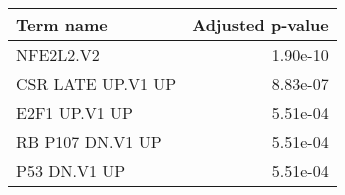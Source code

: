 \begin{tabular}{lr}
\toprule
         Term name &  Adjusted p-value \\
\midrule
         NFE2L2.V2 &          1.90e-10 \\
 CSR LATE UP.V1 UP &          8.83e-07 \\
     E2F1 UP.V1 UP &          5.51e-04 \\
  RB P107 DN.V1 UP &          5.51e-04 \\
      P53 DN.V1 UP &          5.51e-04 \\
\bottomrule
\end{tabular}
